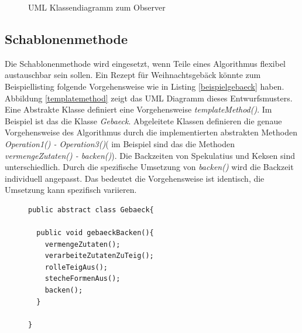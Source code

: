 \begin{figure}[htbp]
  \vspace{0.5cm}
  \centering
   \caption{UML Klassendiagramm zum Observer}
  \label{observer}
  \vspace{0.5cm}
\end{figure}

\subsection{Schablonenmethode}

Die Schablonenmethode wird eingesetzt, wenn Teile eines Algorithmus flexibel austauschbar sein sollen. Ein Rezept für Weihnachtsgebäck könnte zum Beispiellisting folgende Vorgehensweise wie in Listing \ref{beispielgebaeck} haben. Abbildung \ref{templatemethod} zeigt das UML Diagramm dieses Entwurfsmusters. Eine Abstrakte Klasse definiert eine Vorgehensweise \textit{templateMethod()}. Im Beispiel ist das die Klasse \textit{Gebaeck}. Abgeleitete Klassen definieren die genaue Vorgehensweise des Algorithmus durch die implementierten abstrakten Methoden \textit{Operation1() - Operation3()}( im Beispiel sind das die Methoden \textit{vermengeZutaten() - backen()}). Die Backzeiten von Spekulatius und Keksen sind unterschiedlich. Durch die spezifische Umsetzung von \textit{backen()} wird die Backzeit individuell angepasst. Das bedeutet die Vorgehensweise ist identisch, die Umsetzung kann spezifisch variieren.
\begin{figure}[htbp]
\begin{lstlisting}[frame=leftline]
public abstract class Gebaeck{
		
  public void gebaeckBacken(){
    vermengeZutaten();
    verarbeiteZutatenZuTeig();
    rolleTeigAus();
    stecheFormenAus();
    backen();
  }
  
}
\end{lstlisting}

\end{figure}

